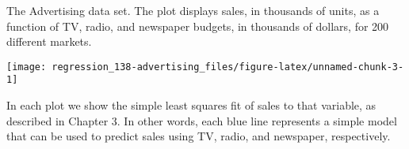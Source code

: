 \documentclass[]{book}
\newenvironment{Shaded}{\begin{snugshade}}{\end{snugshade}}
\newcommand{\DataTypeTok}[1]{\textcolor[rgb]{0.13,0.29,0.53}{#1}}
\newcommand{\DecValTok}[1]{\textcolor[rgb]{0.00,0.00,0.81}{#1}}
\newcommand{\KeywordTok}[1]{\textcolor[rgb]{0.13,0.29,0.53}{\textbf{#1}}}
\newcommand{\NormalTok}[1]{#1}
\newcommand{\OperatorTok}[1]{\textcolor[rgb]{0.81,0.36,0.00}{\textbf{#1}}}
\newcommand{\StringTok}[1]{\textcolor[rgb]{0.31,0.60,0.02}{#1}}
\begin{document}
The Advertising data set. The plot displays sales, in thousands
of units, as a function of TV, radio, and newspaper budgets, in thousands of
dollars, for 200 diﬀerent markets.

\begin{Shaded}
\end{Shaded}

\begin{center}\texttt{[image: regression\_138-advertising\_files/figure-latex/unnamed-chunk-3-1]} \end{center}

In each plot we show the simple least squares
ﬁt of sales to that variable, as described in Chapter 3. In other words, each blue
line represents a simple model that can be used to predict sales using TV, radio,
and newspaper, respectively.
\end{document}
